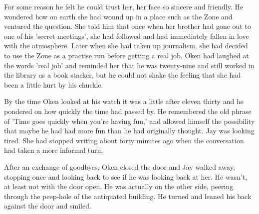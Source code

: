 For some reason he felt he could trust her, her face so sincere and friendly. He wondered how on earth she had wound up in a place such as the Zone and ventured the question. She told him that once when her brother had gone out to one of his 'secret meetings', she had followed and had immediately fallen in love with the atmosphere. Later when she had taken up journalism, she had decided to use the Zone as a practise run before getting a real job. Oken had laughed at the words 'real job' and reminded her that he was twenty-nine and still worked in the library as a book stacker, but he could not shake the feeling that she had been a little hurt by his chuckle.

By the time Oken looked at his watch it was a little after eleven thirty and he pondered on how quickly the time had passed by. He remembered the old phrase of 'Time goes quickly when you're having fun,' and allowed himself the possibility that maybe he had had more fun than he had originally thought. Jay was looking tired. She had stopped writing about forty minutes ago when the conversation had taken a more informal turn.

After an exchange of goodbyes, Oken closed the door and Jay walked away, stopping once and looking back to see if he was looking back at her. He wasn't, at least not with the door open. He was actually on the other side, peering through the peep-hole of the antiquated building. He turned and leaned his back against the door and smiled.



